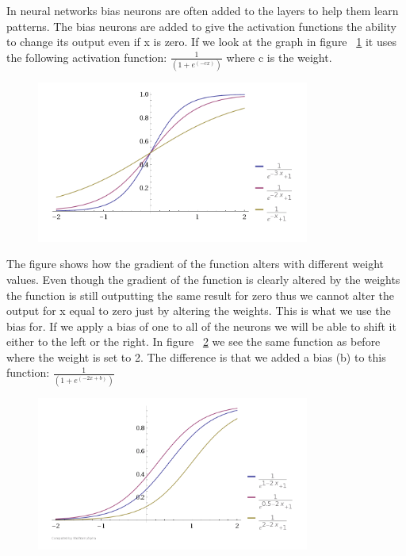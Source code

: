 In neural networks bias neurons are often added to the layers to help them learn patterns. The bias neurons are added to give the activation functions the ability to change its output even if x is zero. If we look at the graph in figure ~\ref{fig:activationFunctions} it uses the following activation function: \begin{math} \frac{1}{(1+e^{(-cx)})} \end{math} where c is the weight.

\begin{figure}[!ht]
\centering
\includegraphics[width=0.8\textwidth ,natwidth=410,natheight=237]{billeder/ActivationFunctions.png}
\caption{}
\label{fig:activationFunctions}
\end{figure}

The figure shows how the gradient of the function alters with different weight values. Even though the gradient of the function is clearly altered by the weights the function is still outputting the same result for zero thus we cannot alter the output for x equal to zero just by altering the weights. This is what we use the bias for. If we apply a bias of one to all of the neurons we will be able to shift it either to the left or the right. In figure ~\ref{fig:activationFunctionsWithBias} we see the same function as before where the weight is set to 2. The difference is that we added a bias (b) to this function: \begin{math} \frac{1}{(1+e^{(-2x+b)})} \end{math} \cite[p. 165]{rojas1996neural,inductiveBias}

\begin{figure}[!ht]
\centering
\includegraphics[width=0.8\textwidth ,natwidth=410,natheight=237]{billeder/ActivationFunctionsWithBias.png}
\caption{}
\label{fig:activationFunctionsWithBias}
\end{figure}

